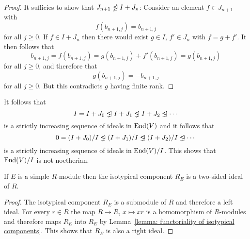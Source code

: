\begin{example}
  \begin{proof}
    It sufficies to show that $J_{n+1} \ntrianglelefteq I + J_n$:
    Consider an element $f \in J_{n+1}$ with
    \[
      f(b_{n+1, j}) = b_{n+1,j}
    \]
    for all $j \geq 0$.
    If $f \in I + J_n$ then there would exist $g \in I$, $f' \in J_n$ with $f = g + f'$.
    It then follows that
    \[
        b_{n+1,j}
      = f(b_{n+1,j})
      = g(b_{n+1,j}) + f'(b_{n+1,j})
      = g(b_{n+1,j})
    \]
    for all $j \geq 0$, and therefore that
    \[
        g(b_{n+1,j})
      = -b_{n+1,j}
    \]
    for all $j \geq 0$.
    But this contradicts $g$ having finite rank.
  \end{proof}

  It follows that
  \[
                I
    =           I + J_0
    \ideallneq  I + J_1
    \ideallneq  I + J_2
    \ideallneq  \dotsb
  \]
  is a strictly increasing sequence of ideals in $\operatorname{End}(V)$ and it follows that
  \[
                0
    =           (I + J_0)/I
    \ideallneq  (I + J_1)/I
    \ideallneq  (I + J_2)/I
    \ideallneq  \dotsb
  \]
  is a strictly increasing sequence of ideals in $\operatorname{End}(V)/I$.
  This shows that $\operatorname{End}(V)/I$ is not noetherian.
\end{example}


\begin{lemma}
  \label{lemma: isotypical components are two sided ideals}
  If $E$ is a simple $R$-module then the isotypical component $R_E$ is a two-sided ideal of $R$.
\end{lemma}


\begin{proof}
  The isotypical component $R_E$ is a submodule of $R$ and therefore a left ideal.
  For every $r \in R$ the map $R \to R$, $x \mapsto xr$ is a homomorphism of $R$-modules and therefore maps $R_E$ into $R_E$ by Lemma~\ref{lemma: functoriality of isotypical components}.
  This shows that $R_E$ is also a right ideal.
\end{proof}


